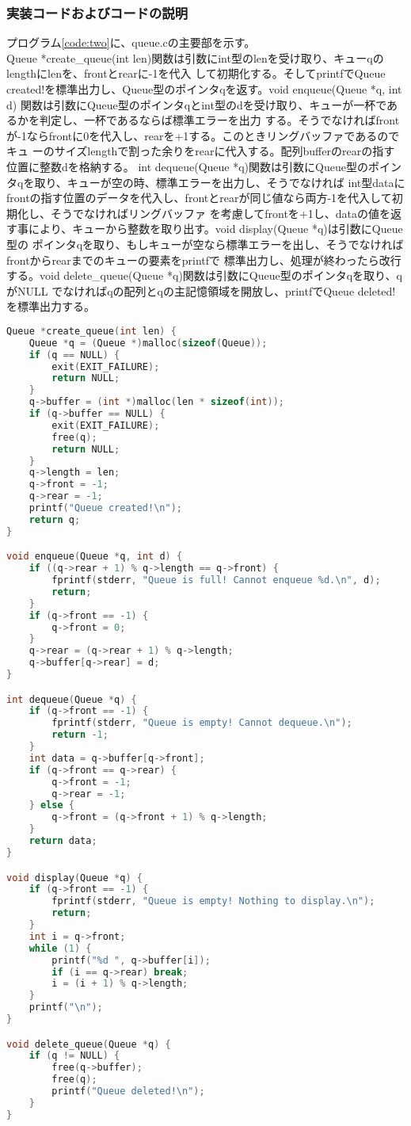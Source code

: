 \documentclass{ltjsarticle}
\begin{document}
\subsubsection{実装コードおよびコードの説明}\label{subsubsec:実装コードおよびコードの説明2}
プログラム\ref{code:two}に、queue.cの主要部を示す。\\ \indent
Queue *create\_queue(int len)関数は引数にint型のlenを受け取り、キューqのlengthにlenを、frontとrearに-1を代入
して初期化する。そしてprintfでQueue created!を標準出力し、Queue型のポインタqを返す。void enqueue(Queue *q, int d)
関数は引数にQueue型のポインタqとint型のdを受け取り、キューが一杯であるかを判定し、一杯であるならば標準エラーを出力
する。そうでなければfrontが-1ならfrontに0を代入し、rearを+1する。このときリングバッファであるのでキュ
ーのサイズlengthで割った余りをrearに代入する。配列bufferのrearの指す位置に整数dを格納する。
int dequeue(Queue *q)関数は引数にQueue型のポインタqを取り、キューが空の時、標準エラーを出力し、そうでなければ
int型dataにfrontの指す位置のデータを代入し、frontとrearが同じ値なら両方-1を代入して初期化し、そうでなければリングバッファ
を考慮してfrontを+1し、dataの値を返す事により、キューから整数を取り出す。void display(Queue *q)は引数にQueue型の
ポインタqを取り、もしキューが空なら標準エラーを出し、そうでなければfrontからrearまでのキューの要素をprintfで
標準出力し、処理が終わったら改行する。void delete\_queue(Queue *q)関数は引数にQueue型のポインタqを取り、qがNULL
でなければqの配列とqの主記憶領域を開放し、printfでQueue deleted!を標準出力する。
\begin{lstlisting}[caption=queue.cの主要部, label=code:two, language=C]
Queue *create_queue(int len) {
    Queue *q = (Queue *)malloc(sizeof(Queue));
    if (q == NULL) {
        exit(EXIT_FAILURE);
        return NULL;
    }
    q->buffer = (int *)malloc(len * sizeof(int));
    if (q->buffer == NULL) {
        exit(EXIT_FAILURE);
        free(q);
        return NULL;
    }
    q->length = len;
    q->front = -1;
    q->rear = -1;
    printf("Queue created!\n");
    return q;
}

void enqueue(Queue *q, int d) {
    if ((q->rear + 1) % q->length == q->front) {
        fprintf(stderr, "Queue is full! Cannot enqueue %d.\n", d);
        return;
    }
    if (q->front == -1) {
        q->front = 0;
    }
    q->rear = (q->rear + 1) % q->length;
    q->buffer[q->rear] = d;
}

int dequeue(Queue *q) {
    if (q->front == -1) {
        fprintf(stderr, "Queue is empty! Cannot dequeue.\n");
        return -1;
    }
    int data = q->buffer[q->front];
    if (q->front == q->rear) {
        q->front = -1;
        q->rear = -1;
    } else {
        q->front = (q->front + 1) % q->length;
    }
    return data;
}

void display(Queue *q) {
    if (q->front == -1) {
        fprintf(stderr, "Queue is empty! Nothing to display.\n");
        return;
    }
    int i = q->front;
    while (1) {
        printf("%d ", q->buffer[i]);
        if (i == q->rear) break;
        i = (i + 1) % q->length;
    }
    printf("\n");
}

void delete_queue(Queue *q) {
    if (q != NULL) {
        free(q->buffer);
        free(q);
        printf("Queue deleted!\n");
    }
} 
\end{lstlisting}
\end{document}
